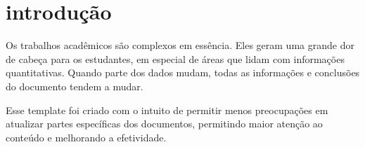 \section{introdução}

Os trabalhos acadêmicos são complexos em essência. Eles geram uma grande dor de cabeça para os estudantes, em especial de áreas que lidam com informações quantitativas. Quando parte dos dados mudam, todas as informações e conclusões do documento tendem a mudar.

Esse template foi criado com o intuito de permitir menos preocupações em atualizar partes específicas dos documentos, permitindo maior atenção ao conteúdo e melhorando a efetividade.
